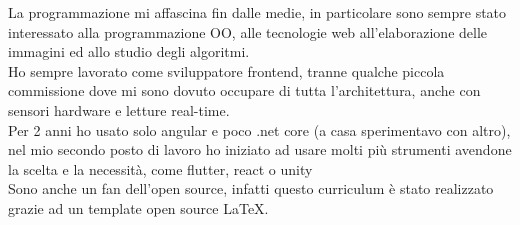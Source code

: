 


\begin{cvparagraph}
La programmazione mi affascina fin dalle medie, in particolare sono sempre stato interessato alla programmazione OO, alle tecnologie web all'elaborazione delle immagini ed allo studio degli algoritmi.\\
Ho sempre lavorato come sviluppatore frontend, tranne qualche piccola commissione dove mi sono dovuto occupare di tutta l'architettura, anche con sensori hardware e letture real-time.\\
Per 2 anni ho usato solo angular e poco .net core (a casa sperimentavo con altro), nel mio secondo posto di lavoro ho iniziato ad usare molti più strumenti avendone la scelta e la necessità, come flutter, react o unity\\
Sono anche un fan dell'open source, infatti questo curriculum è stato realizzato grazie ad un template open source \LaTeX.
\end{cvparagraph}



